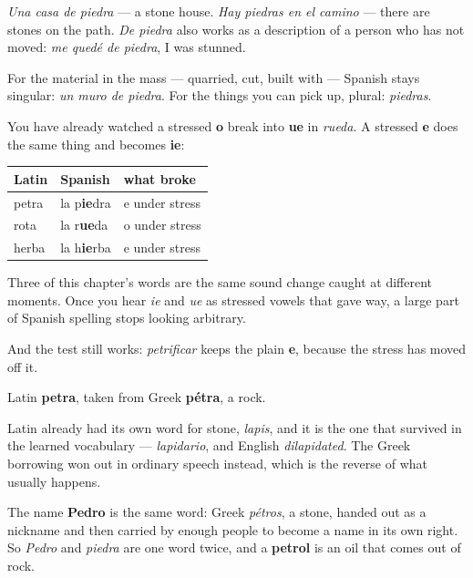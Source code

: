 \emph{Una casa de piedra} — a stone house. \emph{Hay piedras en el camino} — there are stones on the path. \emph{De piedra} also works as a description of a person who has not moved: \emph{me quedé de piedra}, I was stunned.

For the material in the mass — quarried, cut, built with — Spanish stays singular: \emph{un muro de piedra}. For the things you can pick up, plural: \emph{piedras}.

\begin{grammarlens}[title={Grammar Lens: the same vowel trick, one row over}]
You have already watched a stressed \textbf{o} break into \textbf{ue} in \emph{rueda}. A stressed \textbf{e} does the same thing and becomes \textbf{ie}:

\noindent
\begin{tabularx}{\linewidth}{@{}>{\raggedright\arraybackslash}X>{\raggedright\arraybackslash}X>{\raggedright\arraybackslash}X@{}}
\toprule
\textbf{Latin} & \textbf{Spanish} & \textbf{what broke} \\
\midrule
petra & la p\textbf{ie}dra & e under stress \\
rota & la r\textbf{ue}da & o under stress \\
herba & la h\textbf{ie}rba & e under stress \\
\bottomrule
\end{tabularx}

Three of this chapter's words are the same sound change caught at different moments. Once you hear \emph{ie} and \emph{ue} as stressed vowels that gave way, a large part of Spanish spelling stops looking arbitrary.

And the test still works: \emph{petrificar} keeps the plain \textbf{e}, because the stress has moved off it.
\end{grammarlens}

\begin{cousinweb}
Latin \textbf{petra}, taken from Greek \textbf{pétra}, a rock.

Latin already had its own word for stone, \emph{lapis}, and it is the one that survived in the learned vocabulary — \emph{lapidario}, and English \emph{dilapidated}. The Greek borrowing won out in ordinary speech instead, which is the reverse of what usually happens.

The name \textbf{Pedro} is the same word: Greek \emph{pétros}, a stone, handed out as a nickname and then carried by enough people to become a name in its own right. So \emph{Pedro} and \emph{piedra} are one word twice, and a \textbf{petrol} is an oil that comes out of rock.
\end{cousinweb}

